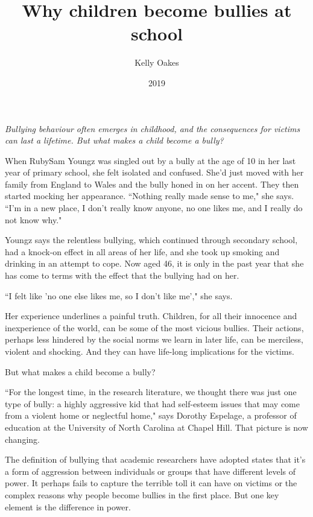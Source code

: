 \documentclass[10pt,a4paper]{article}
\newcommand{\qm}[1]{``#1"}
\begin{document}
\title{Why children become bullies at school}
\date{2019}
\author{Kelly Oakes}

\maketitle

\noindent\textit{Bullying behaviour often emerges in childhood, and the consequences for victims can last a lifetime. But what makes a child become a bully?}

\bigskip

\noindent\linenumbers When RubySam Youngz was singled out by a bully at the age of 10 in her last year of primary school, she felt isolated and confused. She'd just moved with her family from England to Wales and the bully honed in on her accent. They then started mocking her appearance. \qm{Nothing really made sense to me,} she says. \qm{I'm in a new place, I don't really know anyone, no one likes me, and I really do not know why.}

Youngz says the relentless bullying, which continued through secondary school, had a knock-on effect in all areas of her life, and she took up smoking and drinking in an attempt to cope. Now aged 46, it is only in the past year that she has come to terms with the effect that the bullying had on her.

\qm{I felt like 'no one else likes me, so I don't like me',} she says.

Her experience underlines a painful truth. Children, for all their innocence and inexperience of the world, can be some of the most vicious bullies. Their actions, perhaps less hindered by the social norms we learn in later life, can be merciless, violent and shocking. And they can have life-long implications for the victims.

But what makes a child become a bully?

\qm{For the longest time, in the research literature, we thought there was just one type of bully: a highly aggressive kid that had self-esteem issues that may come from a violent home or neglectful home,} says Dorothy Espelage, a professor of education at the University of North Carolina at Chapel Hill. That picture is now changing.

The definition of bullying that academic researchers have adopted states that it's a form of aggression between individuals or groups that have different levels of power. It perhaps fails to capture the terrible toll it can have on victims or the complex reasons why people become bullies in the first place. But one key element is the difference in power.
\end{document}
